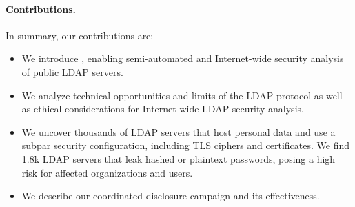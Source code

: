 



\paragraph{Contributions.} In summary, our contributions are:
\begin{itemize}
    \item We introduce \NAME, enabling semi-automated and Internet-wide security analysis of public \acrshort{LDAP} servers. 

    \item We analyze technical opportunities and limits of the \acrshort{LDAP} protocol as well as ethical considerations for Internet-wide \acrshort{LDAP} security analysis. 

    \item We uncover thousands of LDAP servers that host personal data and use a subpar 
    security configuration, including TLS ciphers and certificates. We find 1.8k LDAP servers that leak hashed or plaintext passwords, posing a high risk for affected organizations and users.

    \item We describe our coordinated disclosure campaign and its effectiveness.
\end{itemize}


